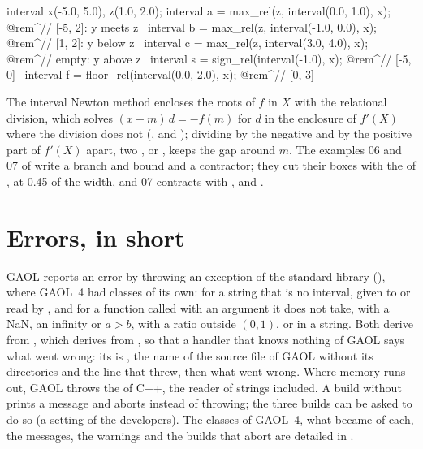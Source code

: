 \begin{example}
interval x(-5.0, 5.0), z(1.0, 2.0);
interval a = max_rel(z, interval(0.0, 1.0), x);   @rem^// [-5, 2]: y meets z~
interval b = max_rel(z, interval(-1.0, 0.0), x);  @rem^// [1, 2]: y below z~
interval c = max_rel(z, interval(3.0, 4.0), x);   @rem^// empty: y above z~
interval s = sign_rel(interval(-1.0), x);         @rem^// [-5, 0]~
interval f = floor_rel(interval(0.0, 2.0), x);    @rem^// [0, 3]~
\end{example}

\medskip
The interval Newton method encloses the roots of $f$ in $X$ with the
relational division, which solves $(x-m)\,d=-f(m)$ for $d$ in the enclosure of
$f'(X)$ where the division \code{/} does not (, and
); dividing by the negative and by the
positive part of $f'(X)$ apart, two , or
, keeps the gap around $m$. The examples 06 and 07
of  write a branch and bound and a contractor; they cut their
boxes with the  of , at 0.45 of the width,
and 07 contracts with ,  and
.

\section{Errors, in short}\label{sec:errors-overview}
%

GAOL reports an error by throwing an exception of the standard library
(), where GAOL~4 had classes of its own:\newinvfive{}
 for a string that is no interval, given to
 or read by , and
 for a function called with an argument it does not
take,  with a NaN, an infinity or $a>b$,  with a ratio
outside $(0,1)$, or  in a string. Both derive from
, which derives from , so that a
handler that knows nothing of GAOL says what went wrong: its  is
, the name of the source file
of GAOL without its directories and the line that threw, then what went
wrong. Where memory runs out, GAOL throws the  of C++,
the reader of strings included. A build without
 prints a message and aborts instead of
throwing; the three builds can be asked to do so (a setting of the developers). The classes of GAOL~4, what
became of each, the messages, the warnings and the builds that abort are
detailed in .


